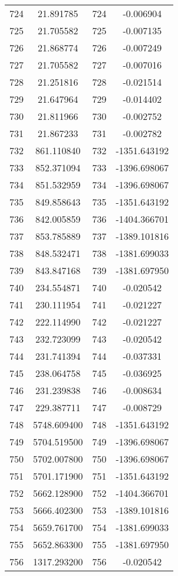 \documentclass[12pt]{article}
\begin{document}
\begin{longtable}{@{}cccc@{}}
724 & 21.891785 & 724 & -0.006904 \\
725 & 21.705582 & 725 & -0.007135 \\
726 & 21.868774 & 726 & -0.007249 \\
727 & 21.705582 & 727 & -0.007016 \\
728 & 21.251816 & 728 & -0.021514 \\
729 & 21.647964 & 729 & -0.014402 \\
730 & 21.811966 & 730 & -0.002752 \\
731 & 21.867233 & 731 & -0.002782 \\
732 & 861.110840 & 732 & -1351.643192 \\
733 & 852.371094 & 733 & -1396.698067 \\
734 & 851.532959 & 734 & -1396.698067 \\
735 & 849.858643 & 735 & -1351.643192 \\
736 & 842.005859 & 736 & -1404.366701 \\
737 & 853.785889 & 737 & -1389.101816 \\
738 & 848.532471 & 738 & -1381.699033 \\
739 & 843.847168 & 739 & -1381.697950 \\
740 & 234.554871 & 740 & -0.020542 \\
741 & 230.111954 & 741 & -0.021227 \\
742 & 222.114990 & 742 & -0.021227 \\
743 & 232.723099 & 743 & -0.020542 \\
744 & 231.741394 & 744 & -0.037331 \\
745 & 238.064758 & 745 & -0.036925 \\
746 & 231.239838 & 746 & -0.008634 \\
747 & 229.387711 & 747 & -0.008729 \\
748 & 5748.609400 & 748 & -1351.643192 \\
749 & 5704.519500 & 749 & -1396.698067 \\
750 & 5702.007800 & 750 & -1396.698067 \\
751 & 5701.171900 & 751 & -1351.643192 \\
752 & 5662.128900 & 752 & -1404.366701 \\
753 & 5666.402300 & 753 & -1389.101816 \\
754 & 5659.761700 & 754 & -1381.699033 \\
755 & 5652.863300 & 755 & -1381.697950 \\
756 & 1317.293200 & 756 & -0.020542 \\

\end{longtable}
\end{document}
